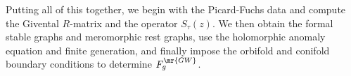 Putting all of this together, we begin with the Picard-Fuchs data and compute the Givental \(R\)-matrix and the operator \(S_{\tau}(z)\). We then obtain the formal stable graphs and meromorphic rest graphs, use the holomorphic anomaly equation and finite generation, and finally impose the orbifold and conifold boundary conditions to determine \(F_g^{\mr{GW}}\).

